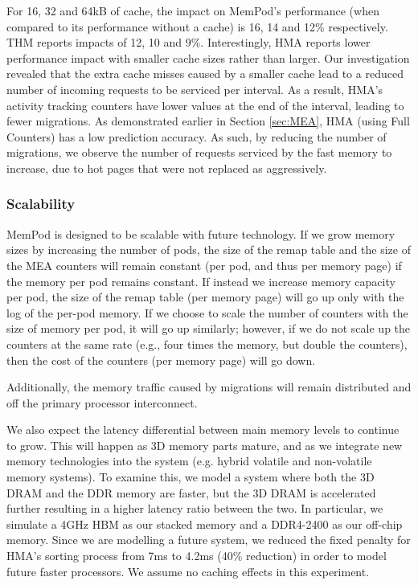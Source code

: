For 16, 32 and 64kB of cache, the impact on MemPod's performance (when compared to its performance without a cache) is 16, 14 and 12\% respectively. THM reports impacts of 12, 10 and 9\%. Interestingly, HMA reports lower performance impact with smaller cache sizes rather than larger. Our investigation revealed that the extra cache misses caused by a smaller cache lead to a reduced number of incoming requests to be serviced per interval. As a result, HMA's activity tracking counters have lower values at the end of the interval, leading to fewer migrations. As demonstrated earlier in Section \ref{sec:MEA}, HMA (using Full Counters) has a low prediction accuracy. As such, by reducing the number of migrations, we observe the number of requests serviced by the fast memory to 
increase, due to hot pages that were not replaced as aggressively.

\subsubsection{Scalability}

MemPod is designed to be scalable with future technology.  If we grow memory
sizes by increasing the number of pods, the size of the remap table and the 
size of the MEA counters will remain constant (per pod, and thus per memory
page) if the memory per pod remains constant.  If instead we increase
memory capacity per pod, the size of the remap table (per memory page)
will go up only with the log of the per-pod memory. If we choose to scale
the number of counters with the size of memory per pod, it will go up
similarly; however, if we do not scale up the counters at the same rate
(e.g., four times the memory, but double the counters), then the cost
of the counters (per memory page) will go down.

Additionally, the memory traffic caused by migrations will remain distributed
and off the primary processor interconnect.

We also expect the latency differential between main memory levels to 
continue to grow.  This will happen as 3D memory parts mature, and as
we integrate new memory technologies into the system (e.g. hybrid
volatile and non-volatile memory systems).
To examine this, we model a system where both the 3D DRAM and the DDR memory
are faster, but the 3D DRAM is accelerated further resulting in a higher
latency ratio between the two. 
In particular, we simulate a 4GHz HBM as our stacked memory and a DDR4-2400 as our off-chip memory. Since we are modelling a future system, we reduced the fixed penalty for HMA's sorting process from 7ms to 4.2ms (40\% reduction) in order to model future faster processors.
We assume no caching effects in this experiment.

